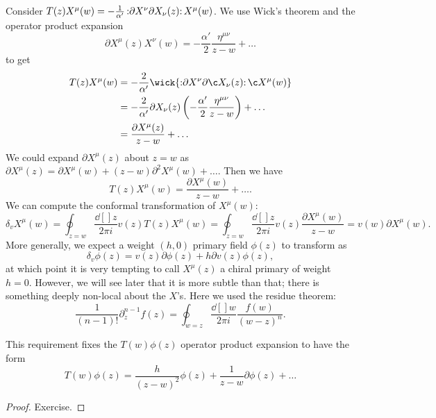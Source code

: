 Consider $ T(z) X^{\mu}(w) = -\frac{1}{\alpha'} \mathop{:}\nolimits\!\partial X^{\nu} \partial X_{\nu} (z)\!\mathop{:}\nolimits X^{\mu}(w)$.
We use Wick's theorem and the operator product expansion
\begin{equation}
  \label{eq:14-pxxope}
  \partial X^{\mu}(z) X^{\nu}(w) = -\frac{\alpha'}{2} \frac{\eta^{\mu\nu}}{z - w} + \dots
\end{equation}
to get
\begin{align}
  T(z) X^{\mu}(w) &= -\frac{2}{\alpha'} \wick{\normalorder{ \partial X^{\nu} \partial \c X_{\nu}(z)} \c X^{\mu}(w)} \\
		  &= -\frac{2}{\alpha'} \partial X_{\nu}(z) \left( -\frac{\alpha'}{2} \frac{\eta^{\mu\nu}}{z - w}  \right) + \dots \\
		  &= \frac{\partial X^{\mu}(z)}{z - w} + \dots
\end{align}
We could expand $\partial X^{\mu}(z)$ about $z = w$ as $\partial X^{\mu}(z) = \partial X^{\mu}(w) + (z-w) \partial^2 X^{\mu}(w) + \dots$.
Then we have
\begin{equation}
  T(z) X^{\mu}(w) = \frac{\partial X^{\mu}(w)}{z - w} + \dots.
\end{equation}
We can compute the conformal transformation of $X^{\mu}(w)$:
\begin{equation}
  \delta_v X^{\mu}(w) = \oint_{z = w} \frac{ \dd[]{z}}{2 \pi i} v(z) T(z) X^{\mu}(w) = \oint_{z = w} \frac{\dd[]{z}}{2 \pi i} v(z) \frac{\partial X^{\mu}(w)}{z - w} = v(w) \partial X^{\mu}(w).
\end{equation}
More generally, we expect a weight $(h, 0)$ primary field $\phi(z)$ to transform as
\begin{equation}
  \delta_v \phi(z) = v(z) \partial \phi(z) + h \partial v (z) \phi(z),
\end{equation}
at which point it is very tempting to call $X^{\mu}(z)$ a chiral primary of weight $h = 0$. However, we will see later that it is more subtle than that; there is something deeply non-local about the $X$'s.
Here we used the residue theorem:
\begin{equation}
  \frac{1}{(n - 1)!} \partial_z^{n-1} f(z) = \oint_{w = z} \frac{\dd[]{w}}{2 \pi i} \frac{f(w)}{(w - z)^n}.
\end{equation}

\begin{claim}
  This requirement fixes the $T(w) \phi(z)$ operator product expansion to have the form
  \begin{equation}
    \label{eq:14-ope}
    \boxed{T(w) \phi(z) = \frac{h}{(z - w)^2} \phi(z) + \frac{1}{z - w} \partial \phi(z) + \dots}
  \end{equation}
\end{claim}
\begin{proof}
  Exercise.
\end{proof}

